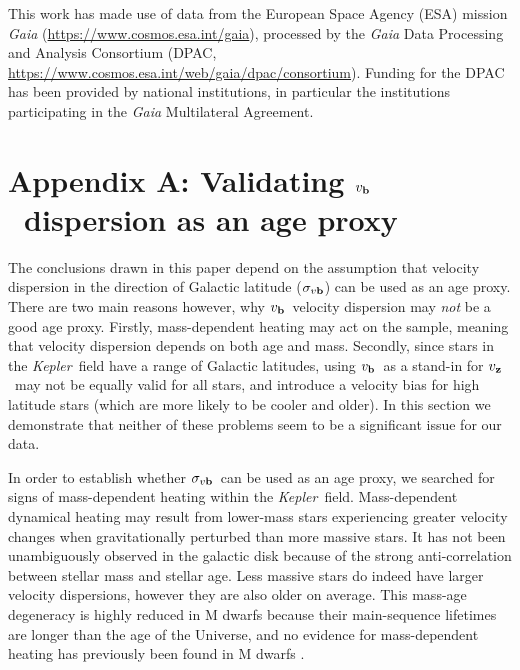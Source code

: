 \documentclass{aastex63}
\newcommand{\eg}{{\it e.g.}}
\newcommand{\kepler}{{\it Kepler}}
\newcommand{\vz}{$v_{\bf z}$}
\newcommand{\vb}{$v_{\bf b}$}
\newcommand{\sigmavb}{$\sigma_{v{\bf b}}$}
\begin{document}
This work has made use of data from the European Space Agency (ESA) mission
{\it Gaia} (\url{https://www.cosmos.esa.int/gaia}), processed by the {\it
Gaia} Data Processing and Analysis Consortium (DPAC,
\url{https://www.cosmos.esa.int/web/gaia/dpac/consortium}).
Funding for the DPAC has been provided by national institutions, in particular
the institutions participating in the {\it Gaia} Multilateral Agreement.

\section{Appendix A: Validating \vb\ dispersion as an age proxy}
\label{sec:mass-dependent-heating}

The conclusions drawn in this paper depend on the assumption that velocity
dispersion in the direction of Galactic latitude (\sigmavb) can be used as an
age proxy.
There are two main reasons however, why \vb\ velocity dispersion may {\it not}
be a good age proxy.
Firstly, mass-dependent heating may act on the sample, meaning that velocity
dispersion depends on both age and mass.
Secondly, since stars in the \kepler\ field have a range of Galactic
latitudes, using \vb\ as a stand-in for \vz\ may not be equally valid for all
stars, and introduce a velocity bias for high latitude stars (which are more
likely to be cooler and older).
In this section we demonstrate that neither of these problems seem to be a
significant issue for our data.

In order to establish whether \sigmavb\ can be used as an age proxy, we
searched for signs of mass-dependent heating within the \kepler\ field.
Mass-dependent dynamical heating may result from lower-mass stars experiencing
greater velocity changes when gravitationally perturbed than more massive
stars.
It has not been unambiguously observed in the galactic disk because of the
strong anti-correlation between stellar mass and stellar age.
Less massive stars do indeed have larger velocity dispersions, however they
are also older on average.
This mass-age degeneracy is highly reduced in M dwarfs because their
main-sequence lifetimes are longer than the age of the Universe, and no
evidence for mass-dependent heating has previously been found in M dwarfs
\citep[\eg][]{faherty2009, newton2016}.
\end{document}
